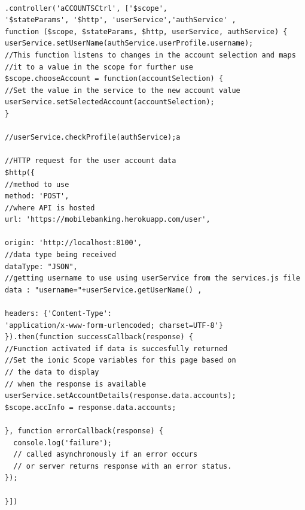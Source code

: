 \begin{verbatim}

.controller('aCCOUNTSCtrl', ['$scope',
'$stateParams', '$http', 'userService','authService' ,
function ($scope, $stateParams, $http, userService, authService) {
userService.setUserName(authService.userProfile.username);
//This function listens to changes in the account selection and maps
//it to a value in the scope for further use
$scope.chooseAccount = function(accountSelection) {
//Set the value in the service to the new account value
userService.setSelectedAccount(accountSelection);
}

//userService.checkProfile(authService);a

//HTTP request for the user account data
$http({
//method to use
method: 'POST',
//where API is hosted
url: 'https://mobilebanking.herokuapp.com/user',

origin: 'http://localhost:8100',
//data type being received
dataType: "JSON",
//getting username to use using userService from the services.js file
data : "username="+userService.getUserName() ,

headers: {'Content-Type':
'application/x-www-form-urlencoded; charset=UTF-8'}
}).then(function successCallback(response) {
//Function activated if data is succesfully returned
//Set the ionic Scope variables for this page based on
// the data to display
// when the response is available
userService.setAccountDetails(response.data.accounts);
$scope.accInfo = response.data.accounts;

}, function errorCallback(response) {
  console.log('failure');
  // called asynchronously if an error occurs
  // or server returns response with an error status.
});

}])

\end{verbatim}

